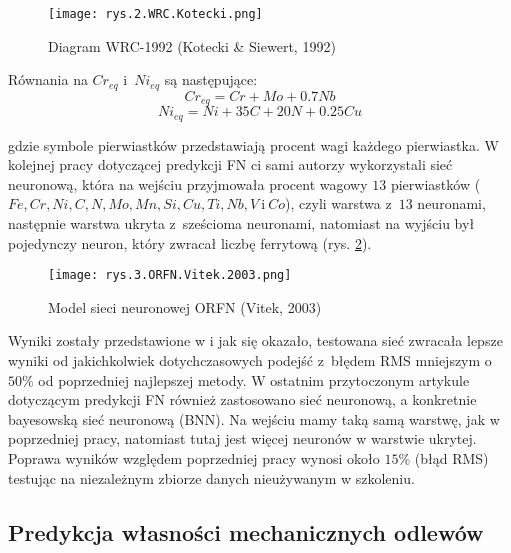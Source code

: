 \begin{figure}[h]
    \centering
    \texttt{[image: rys.2.WRC.Kotecki.png]}
    \caption{Diagram WRC-1992 (Kotecki \& Siewert, 1992)}
    \label{fig:mesh2}
\end{figure}

Równania na  $Cr_{eq}$ i~$Ni_{eq}$ są następujące:
\begin{equation}
\label{eq1}
	Cr_{eq} = Cr + Mo + 0.7Nb
\end{equation}
\begin{equation}
\label{eq2}
	Ni_{eq} = Ni+35C+20N+0.25Cu
\end{equation}

\noindent gdzie symbole pierwiastków przedstawiają procent wagi każdego pierwiastka.
W kolejnej pracy \cite{Vitek03.I} dotyczącej predykcji FN ci sami autorzy wykorzystali sieć neuronową, która na wejściu przyjmowała procent wagowy $13$ pierwiastków ($Fe, Cr, Ni, C, N, Mo, Mn, Si, Cu, Ti, Nb, V~$i$~Co$), czyli warstwa z~$13$ neuronami, następnie warstwa ukryta z~sześcioma neuronami, natomiast na wyjściu był pojedynczy neuron, który zwracał liczbę ferrytową (rys. \ref{fig:mesh3}).

\begin{figure}[h]
    \centering
    \texttt{[image: rys.3.ORFN.Vitek.2003.png]}
    \caption{Model sieci neuronowej ORFN (Vitek, 2003)}
    \label{fig:mesh3}
\end{figure}

Wyniki zostały przedstawione w \cite{Vitek03.II} i jak się okazało, testowana sieć zwracała lepsze wyniki od jakichkolwiek dotychczasowych podejść z~błędem RMS mniejszym o $50\%$ od poprzedniej najlepszej metody. 
    W ostatnim przytoczonym artykule dotyczącym predykcji FN \cite{Vasudevan13} również zastosowano sieć neuronową, a konkretnie bayesowską sieć neuronową (BNN). Na wejściu mamy taką samą warstwę, jak w poprzedniej pracy, natomiast tutaj jest więcej neuronów w warstwie ukrytej. Poprawa wyników względem poprzedniej pracy wynosi około $15\%$ (błąd RMS) testując na niezależnym zbiorze danych nieużywanym w szkoleniu.

\subsection{Predykcja własności mechanicznych odlewów}
\label{sub:predykcja.1}


